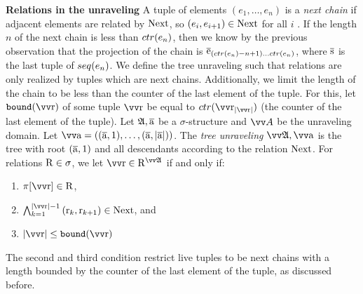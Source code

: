 \noindent
\textbf{Relations in the unraveling}
A tuple of elements $(e_{1}, \ldots, e_{n})$ is a \emph{next chain}  if adjacent  elements are related by $\mathrm{Next}$,  so $(e_{i}, e_{i+1}) \in \mathrm{Next}$ for all $i$ .
If the length $n$ of the next chain is less than $\ctr{e_{n}}$, then we know by the previous observation that the projection of the chain is $\elemtuplee_{(\ctr{e_{n}}-n+1)\ldots{}\ctr{e_{n}}}$, where $\overline{\mathrm{s}}$ is the last tuple of $\seq{e_{n}}$.
We define the tree unraveling such that relations are only realized by tuples which are next chains.
Additionally, we limit the length of the chain to be less than the counter of the last element of the tuple.
For this, let $\mathtt{bound}(\elemtuptupler)$ of some tuple $\elemtuptupler$ be equal to $\ctr{\elemtuptupler_{|\elemtuptupler|}}$ (the counter of the last element of the tuple).
Let ${\mathfrak{A}}, \overline{\mathrm{a}}$ be a $\sigma$-structure and $\unraveldom{A}$ be the unraveling domain.
Let $\elemtuptuplea = ((\elemtuplea, 1), \ldots, (\elemtuplea, |\elemtuplea|))$.
The \emph{tree unraveling} $\unravel{A}, \elemtuptuplea$ is the tree with root $(\overline{\mathrm{a}}, 1)$ and all descendants according to the relation $\mathrm{Next}$.
For relations $\mathrm{R} \in \sigma$, we let $\elemtuptupler \in \relR^{\unravel{A}}$ if and only if: 
\begin{enumerate}
  \item $\pi[\elemtuptupler] \in \relR^{}$, 
  \item $\bigwedge_{k=1}^{|\elemtuptupler|-1}{(\elemr_{k},\elemr_{k+1}) \in \relNext}$, and
  \item $|\elemtuptupler| \le \mathtt{bound}(\elemtuptupler)$
\end{enumerate}
The second and third condition restrict live tuples to be next chains with a length bounded by the counter of the last element of the tuple, as discussed before.

